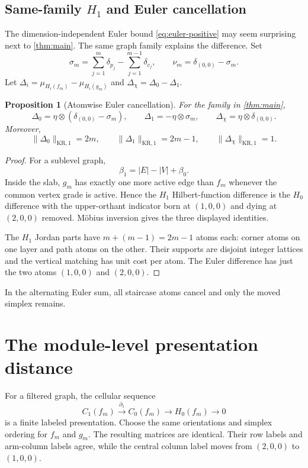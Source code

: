 \documentclass[11pt]{article}
\newtheorem{proposition}[proposition]{Proposition}
\theoremstyle{definition}
\newcommand{\1}{\mathbf{1}}
\newcommand{\KR}{\mathrm{KR}}
\begin{document}
\subsection[Same-family H1 and Euler cancellation]
{Same-family \(H_1\) and Euler cancellation}

The dimension-independent Euler bound \eqref{eq:euler-positive} may seem
surprising next to \cref{thm:main}.  The same graph family explains the
difference.
Set
\[
  \sigma_m=\sum_{j=1}^m\delta_{p_j}
          -\sum_{j=1}^{m-1}\delta_{c_j},
  \qquad
  \nu_m=\delta_{(0,0)}-\sigma_m.
\]
Let $\Delta_i=\mu_{H_i(f_m)}-\mu_{H_i(g_m)}$ and
$\Delta_\chi=\Delta_0-\Delta_1$.

\begin{proposition}[Atomwise Euler cancellation]\label{prop:euler-cancel}
For the family in \cref{thm:main},
\[
  \Delta_0=\eta\otimes(\delta_{(0,0)}-\sigma_m),\qquad
  \Delta_1=-\eta\otimes\sigma_m,\qquad
  \Delta_\chi=\eta\otimes\delta_{(0,0)}.
\]
Moreover,
\[
  \lVert\Delta_0\rVert_{\KR,1}=2m,\qquad
  \lVert\Delta_1\rVert_{\KR,1}=2m-1,\qquad
  \lVert\Delta_\chi\rVert_{\KR,1}=1.
\]
\end{proposition}

\begin{proof}
For a sublevel graph,
\[
  \beta_1=|E|-|V|+\beta_0.
\]
Inside the slab, $g_m$ has exactly one more active edge than $f_m$ whenever
the common vertex grade is active.  Hence the $H_1$ Hilbert-function
difference is the $H_0$ difference with the upper-orthant indicator born at
$(1,0,0)$ and dying at $(2,0,0)$ removed.  Möbius inversion gives the three
displayed identities.

The $H_1$ Jordan parts have $m+(m-1)=2m-1$ atoms each: corner atoms on one
layer and path atoms on the other.  Their supports are disjoint integer
lattices and the vertical matching has unit cost per atom.  The Euler
difference has just the two atoms $(1,0,0)$ and $(2,0,0)$.
\end{proof}

In the alternating Euler sum, all staircase atoms cancel and only the moved
simplex remains.

\section{The module-level presentation distance}\label{sec:p3}

For a filtered graph, the cellular sequence
\[
  C_1(f_m)\xrightarrow{\partial_1}C_0(f_m)
  \longrightarrow H_0(f_m)\longrightarrow0
\]
is a finite labeled presentation.  Choose the same orientations and simplex
ordering for $f_m$ and $g_m$.  The resulting matrices are identical.  Their
row labels and arm-column labels agree, while the central column label moves
from $(2,0,0)$ to $(1,0,0)$.
\end{document}
